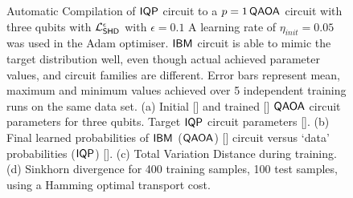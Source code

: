 \begin{figure}
\begin{subfigure}[t]{0.45\textwidth}
    \caption{}
    \label{subfig:auto_comp_sink_3}
\end{subfigure}
\caption{Automatic Compilation of $\operatorname{\textsf{IQP}}$ circuit to a $p = 1 \operatorname{\textsf{QAOA}}$ circuit with three qubits with $\mathcal{L}_{\operatorname{\textsf{SHD}}}^\epsilon$ with $\epsilon = 0.1$ A learning rate of $\eta_{init} = 0.05$ was used in the Adam optimiser. $\textsf{IBM}$ circuit is able to mimic the target distribution well, even though actual achieved parameter values, and circuit families are different. Error bars represent mean, maximum and minimum values achieved over 5 independent training runs on the same data set. (a)  Initial [\crule[cyan]{0.2cm}{0.2cm}] and trained [\crule[Lavender]{0.2cm}{0.2cm}] $\operatorname{\textsf{QAOA}}$ circuit parameters for three qubits. Target $\operatorname{\textsf{IQP}}$ circuit parameters [\crule[green]{0.2cm}{0.2cm}]. (b) Final learned probabilities of $\textsf{IBM}$ ($\operatorname{\textsf{QAOA}}$) [\crule[blue]{0.2cm}{0.2cm}] circuit versus `data' probabilities ($\operatorname{\textsf{IQP}}$) [\crule[black]{0.2cm}{0.2cm}]. (c) Total Variation Distance during training. (d) Sinkhorn divergence for  400 training samples, 100 test samples, using a Hamming optimal transport cost.}\label{fig:autocompilationthreequbits}
\end{figure}
